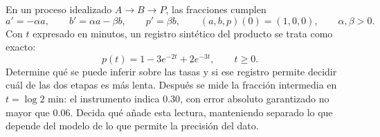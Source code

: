 En un proceso idealizado \(A\to B\to P\), las fracciones cumplen
\[
a'=-\alpha a,\qquad b'=\alpha a-\beta b,\qquad p'=\beta b,
\qquad (a,b,p)(0)=(1,0,0),\qquad \alpha,\beta>0.
\]
Con \(t\) expresado en minutos, un registro sintético del producto se trata como exacto:
\[
p(t)=1-3e^{-2t}+2e^{-3t},\qquad t\ge0.
\]
Determine qué se puede inferir sobre las tasas y si ese registro permite decidir cuál de las dos etapas es más lenta. Después se mide la fracción intermedia en \(t=\log2\) min: el instrumento indica \(0.30\), con error absoluto garantizado no mayor que \(0.06\). Decida qué añade esta lectura, manteniendo separado lo que depende del modelo de lo que permite la precisión del dato.
